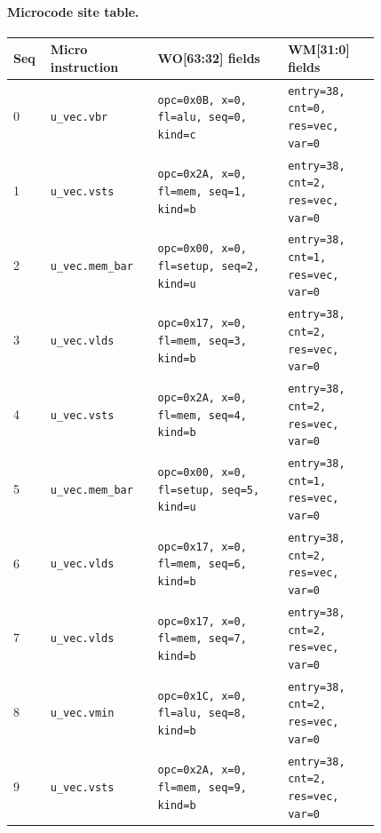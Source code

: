 \paragraph{Microcode site table.}
{\scriptsize
\begin{longtable}{@{}R{0.055\linewidth}L{0.23\linewidth}L{0.31\linewidth}L{0.22\linewidth}@{}}
\toprule
Seq & Micro instruction & WO[63:32] fields & WM[31:0] fields \\
 & \texttt{u\_vec.vbr} & \texttt{opc=0x0B, x=0, fl=alu, seq=0, kind=c} & \texttt{entry=38, cnt=0, res=vec, var=0} \\
1 & \texttt{u\_vec.vsts} & \texttt{opc=0x2A, x=0, fl=mem, seq=1, kind=b} & \texttt{entry=38, cnt=2, res=vec, var=0} \\
2 & \texttt{u\_vec.mem\_bar} & \texttt{opc=0x00, x=0, fl=setup, seq=2, kind=u} & \texttt{entry=38, cnt=1, res=vec, var=0} \\
3 & \texttt{u\_vec.vlds} & \texttt{opc=0x17, x=0, fl=mem, seq=3, kind=b} & \texttt{entry=38, cnt=2, res=vec, var=0} \\
4 & \texttt{u\_vec.vsts} & \texttt{opc=0x2A, x=0, fl=mem, seq=4, kind=b} & \texttt{entry=38, cnt=2, res=vec, var=0} \\
5 & \texttt{u\_vec.mem\_bar} & \texttt{opc=0x00, x=0, fl=setup, seq=5, kind=u} & \texttt{entry=38, cnt=1, res=vec, var=0} \\
6 & \texttt{u\_vec.vlds} & \texttt{opc=0x17, x=0, fl=mem, seq=6, kind=b} & \texttt{entry=38, cnt=2, res=vec, var=0} \\
7 & \texttt{u\_vec.vlds} & \texttt{opc=0x17, x=0, fl=mem, seq=7, kind=b} & \texttt{entry=38, cnt=2, res=vec, var=0} \\
8 & \texttt{u\_vec.vmin} & \texttt{opc=0x1C, x=0, fl=alu, seq=8, kind=b} & \texttt{entry=38, cnt=2, res=vec, var=0} \\
9 & \texttt{u\_vec.vsts} & \texttt{opc=0x2A, x=0, fl=mem, seq=9, kind=b} & \texttt{entry=38, cnt=2, res=vec, var=0} \\
\bottomrule
\end{longtable}
}
